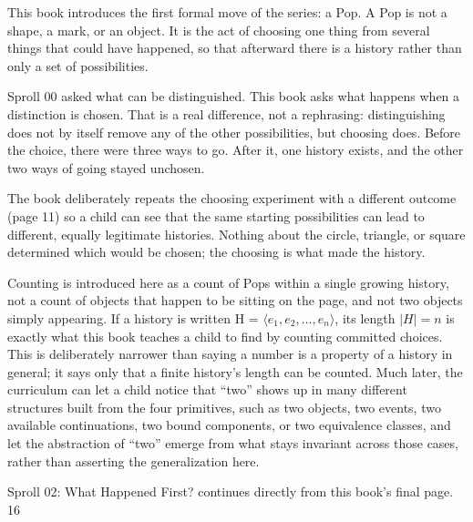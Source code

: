 \documentclass[12pt]{book}
\newcommand{\pagenum}[1]{\vfill{\color{gray!50}\footnotesize #1}}
\begin{document}
\normalsize
This book introduces the first formal move of the series: a Pop. A Pop is not a shape, a mark, or an object. It is the act of choosing one thing from several things that could have happened, so that afterward there is a history rather than only a set of possibilities.

\vspace{0.15in}
Sproll 00 asked what can be distinguished. This book asks what happens when a distinction is chosen. That is a real difference, not a rephrasing: distinguishing does not by itself remove any of the other possibilities, but choosing does. Before the choice, there were three ways to go. After it, one history exists, and the other two ways of going stayed unchosen.

\vspace{0.15in}
The book deliberately repeats the choosing experiment with a different outcome (page 11) so a child can see that the same starting possibilities can lead to different, equally legitimate histories. Nothing about the circle, triangle, or square determined which would be chosen; the choosing is what made the history.

\vspace{0.15in}
Counting is introduced here as a count of Pops within a single growing history, not a count of objects that happen to be sitting on the page, and not two objects simply appearing. If a history is written H = $\langle e_1, e_2, \ldots, e_n \rangle$, its length $|H| = n$ is exactly what this book teaches a child to find by counting committed choices. This is deliberately narrower than saying a number is a property of a history in general; it says only that a finite history's length can be counted. Much later, the curriculum can let a child notice that ``two'' shows up in many different structures built from the four primitives, such as two objects, two events, two available continuations, two bound components, or two equivalence classes, and let the abstraction of ``two'' emerge from what stays invariant across those cases, rather than asserting the generalization here.

\vspace{0.3in}
{\small Sproll 02: What Happened First? continues directly from this book's final page.}
\pagenum{16}
\end{document}
